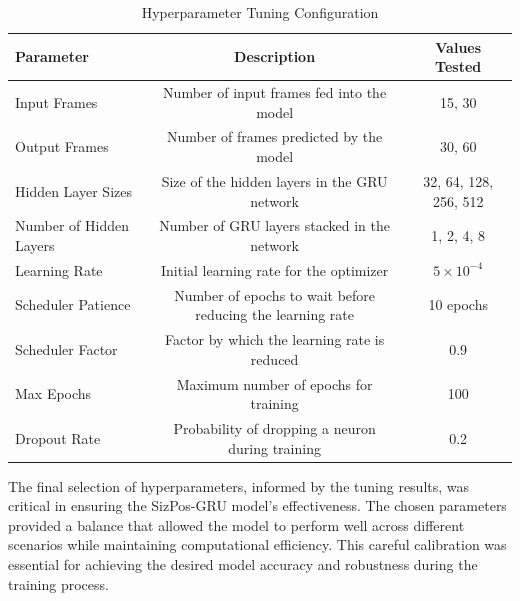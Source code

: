 \documentclass[12pt,oneside]{book} %
\begin{document}
\begin{table}[H]
    \centering
    \caption{Hyperparameter Tuning Configuration}
    \label{tab:hp_tuning}
    \begin{adjustbox}{max width=\textwidth}
        \begin{tabular}{lcc}
            \toprule
            \textbf{Parameter}      & \textbf{Description}                                       & \textbf{Values Tested} \\ 
            \midrule
            Input Frames            & Number of input frames fed into the model                  & 15, 30                 \\ 
            Output Frames           & Number of frames predicted by the model                    & 30, 60                 \\ 
            Hidden Layer Sizes      & Size of the hidden layers in the GRU network               & 32, 64, 128, 256, 512  \\ 
            Number of Hidden Layers & Number of GRU layers stacked in the network                & 1, 2, 4, 8             \\ 
            Learning Rate           & Initial learning rate for the optimizer                    & $5 \times 10^{-4}$     \\ 
            Scheduler Patience      & Number of epochs to wait before reducing the learning rate & 10 epochs              \\ 
            Scheduler Factor        & Factor by which the learning rate is reduced               & 0.9                    \\ 
            Max Epochs              & Maximum number of epochs for training                      & 100                    \\ 
            Dropout Rate            & Probability of dropping a neuron during training           & 0.2                    \\ 
            \bottomrule
        \end{tabular}
    \end{adjustbox}
\end{table}

\noindent The final selection of hyperparameters, informed by the tuning results, was
critical in ensuring the SizPos-GRU model's effectiveness. The chosen
parameters provided a balance that allowed the model to perform well across
different scenarios while maintaining computational efficiency. This careful
calibration was essential for achieving the desired model accuracy and
robustness during the training process.
\end{document}
